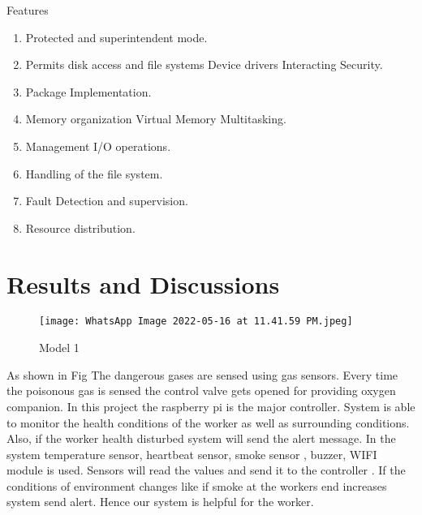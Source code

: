 \documentclass[12pt,a4paper]{report}
\begin{document}
\noindent 

\noindent Features 

\begin{enumerate}
\item  Protected and superintendent mode.

\item  Permits disk access and file systems Device drivers Interacting Security.

\item  Package Implementation.

\item  Memory organization Virtual Memory Multitasking.

\item  Management I/O operations.

\item  Handling of the file system.

\item  Fault Detection and supervision.

\item  Resource distribution.
\end{enumerate}

\noindent \textbf{}


\section{ Results and Discussions}

\noindent 


\noindent 
\begin{figure}[htp]
    \texttt{[image: WhatsApp Image 2022-05-16 at 11.41.59 PM.jpeg]}
    \caption{Model 1}
\end{figure}



\noindent As shown in Fig  The dangerous gases are sensed using gas sensors. Every time the poisonous gas is sensed the control valve gets opened for providing oxygen companion. In this project the raspberry pi is the major controller. System is able to monitor the health conditions of the worker as well as surrounding conditions. Also, if the worker health disturbed system will send the alert message. In the system temperature sensor, heartbeat sensor, smoke sensor , buzzer, WIFI module is used. Sensors will read the values and send it to the controller . If the conditions of environment changes like if smoke at the workers end increases system send alert. Hence our system is helpful for the worker.
\end{document}
